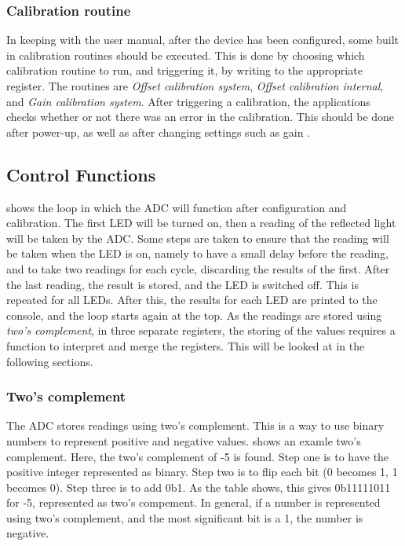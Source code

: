 \documentclass[12pt, a4paper]{article}
\begin{document}
        \subsubsection{Calibration routine}
                In keeping with the user manual, after the device has been configured, some built in calibration
                routines should be executed. This is done by choosing which calibration routine to run, and triggering it,
                by writing to the appropriate register. The routines are \textit{Offset calibration system}, \textit{Offset calibration internal},
                and \textit{Gain calibration system}. After triggering a calibration, the applications checks whether or not there was an
                error in the calibration. This should be done after power-up, as well as after changing settings such as gain  \cite{nau}.


        \subsection{Control Functions}
            
             shows the loop in which the ADC will function after configuration and calibration. The first LED will be turned on, then
            a reading of the reflected light will be taken by the ADC. Some steps are taken to ensure that the reading
            will be taken when the LED is on, namely to have a small delay before the reading, and to take two readings
            for each cycle, discarding the results of the first. After the last reading, the result is stored, and the LED
            is switched off. This is repeated for all LEDs. After this, the results for each LED are printed to the console,
            and the loop starts again at the top. As the readings are stored using \textit{two's complement}, in three separate
            registers, the storing of the values requires a function to interpret and merge the registers. This will be looked at
            in the following sections.

            \subsubsection{Two's complement}

                The ADC stores readings using two's complement. This is a way to use binary numbers to represent positive and negative values.
                 shows an examle two's complement. Here, the two's complement of -5 is found. Step one is to have the positive integer
                represented as binary. Step two is to flip each bit (0 becomes 1, 1 becomes 0). Step three is to add 0b1.
                As the table shows, this gives 0b11111011 for -5, represented as two's compement. In general, if a number is represented using two's complement, and the most significant
                bit is a 1, the number is negative.
\end{document}
